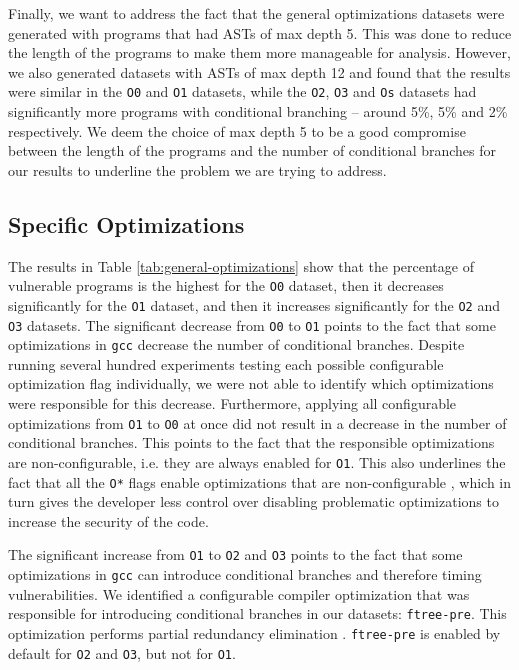 Finally, we want to address the fact that the general optimizations datasets were generated with programs that had ASTs of max depth 5.
This was done to reduce the length of the programs to make them more manageable for analysis.
However, we also generated datasets with ASTs of max depth 12 and found that the results were similar in the \texttt{O0} and \texttt{O1} datasets, while the \texttt{O2}, \texttt{O3} and \texttt{Os} datasets had significantly more programs with conditional branching -- around 5\%, 5\% and 2\% respectively.
We deem the choice of max depth 5 to be a good compromise between the length of the programs and the number of conditional branches for our results to underline the problem we are trying to address.

\subsection{Specific Optimizations}
\label{sec:specific-optimizations}
The results in Table \ref{tab:general-optimizations} show that the percentage of vulnerable programs is the highest for the \texttt{O0} dataset, then it decreases significantly for the \texttt{O1} dataset, and then it increases significantly for the \texttt{O2} and \texttt{O3} datasets.
The significant decrease from \texttt{O0} to \texttt{O1} points to the fact that some optimizations in \texttt{gcc} decrease the number of conditional branches. 
Despite running several hundred experiments testing each possible configurable optimization flag \citep{gcc-manual} individually, we were not able to identify which optimizations were responsible for this decrease.
Furthermore, applying all configurable optimizations from \texttt{O1} to \texttt{O0} at once did not result in a decrease in the number of conditional branches.
This points to the fact that the responsible optimizations are non-configurable, i.e. they are always enabled for \texttt{O1}.
This also underlines the fact that all the \texttt{O*} flags enable optimizations that are non-configurable \citep{gcc-manual}, which in turn gives the developer less control over disabling problematic optimizations to increase the security of the code.

The significant increase from \texttt{O1} to \texttt{O2} and \texttt{O3} points to the fact that some optimizations in \texttt{gcc} can introduce conditional branches and therefore timing vulnerabilities. 
We identified a configurable compiler optimization that was responsible for introducing conditional branches in our datasets: \texttt{ftree-pre}.
This optimization performs partial redundancy elimination \citep{gcc-manual}.
\texttt{ftree-pre} is enabled by default for \texttt{O2} and \texttt{O3}, but not for \texttt{O1}.


